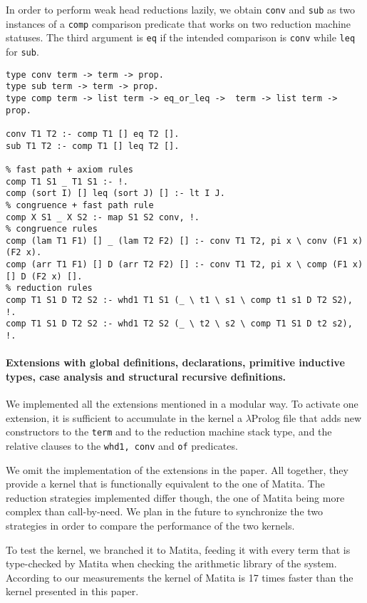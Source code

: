 In order to perform weak head reductions lazily, we obtain \verb+conv+ and \verb+sub+ as two instances of a \verb+comp+ comparison predicate that works on two reduction machine statuses. The third argument is \verb+eq+ if the intended comparison is \verb+conv+ while \verb+leq+ for \verb+sub+.
\begin{Verbatim}
type conv term -> term -> prop.
type sub term -> term -> prop.
type comp term -> list term -> eq_or_leq ->  term -> list term -> prop.

conv T1 T2 :- comp T1 [] eq T2 [].
sub T1 T2 :- comp T1 [] leq T2 [].

% fast path + axiom rules
comp T1 S1 _ T1 S1 :- !.
comp (sort I) [] leq (sort J) [] :- lt I J.
% congruence + fast path rule
comp X S1 _ X S2 :- map S1 S2 conv, !.
% congruence rules
comp (lam T1 F1) [] _ (lam T2 F2) [] :- conv T1 T2, pi x \ conv (F1 x) (F2 x).
comp (arr T1 F1) [] D (arr T2 F2) [] :- conv T1 T2, pi x \ comp (F1 x) [] D (F2 x) [].
% reduction rules
comp T1 S1 D T2 S2 :- whd1 T1 S1 (_ \ t1 \ s1 \ comp t1 s1 D T2 S2), !.
comp T1 S1 D T2 S2 :- whd1 T2 S2 (_ \ t2 \ s2 \ comp T1 S1 D t2 s2), !.
\end{Verbatim}

\paragraph{Extensions with global definitions, declarations, primitive inductive types, case analysis and structural recursive definitions.}
We implemented all the extensions mentioned in a modular way. To activate one extension, it is sufficient to accumulate in the kernel a $\lambda$Prolog file that adds new constructors to the \verb+term+ and to the reduction machine stack type, and the relative clauses to the \verb+whd1, conv+ and \verb+of+ predicates.

We omit the implementation of the extensions in the paper. All together, they provide a kernel that is functionally equivalent to the one of Matita. The reduction strategies implemented differ though, the one of Matita being more complex than call-by-need. We plan in the future to synchronize the two strategies in order to compare the performance of the two kernels.

To test the kernel, we branched it to Matita, feeding it with every term that is type-checked by Matita when checking the arithmetic library of the system.
According to our measurements the kernel of Matita is 17 times faster than the
kernel presented in this paper. 
